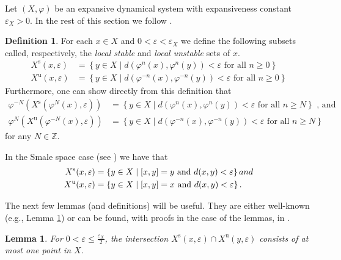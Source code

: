 \documentclass{amsart}
\newcommand{\Z}{{\mathbb Z}}
\theoremstyle{plain}
\newtheorem{lemma}[theorem]{Lemma}
\theoremstyle{definition}
\newtheorem{definition}[theorem]{Definition}
\theoremstyle{remark}
\begin{document}
Let $(X, \varphi)$ be an expansive dynamical system with expansiveness constant $\varepsilon_X > 0$.  In the rest of this section we follow \cite{fried1987}.
\begin{definition}\label{def:loc-stable-unstable-sets}
For each $x \in X$ and $0<\varepsilon < \varepsilon_X$ we define the following subsets called, respectively, the \emph{local stable} and \emph{local unstable} sets of $x$.
\begin{align*}
    X^\text{s}(x, \varepsilon) &= \left\{ y \in X \mid d\left(\varphi^n(x),\varphi^n(y)\right) < \varepsilon \text{ for all } n \geq 0 \right\} \\
    X^\text{u}(x, \varepsilon) &= \left\{ y \in X \mid d\left(\varphi^{-n}(x),\varphi^{-n}(y)\right) < \varepsilon \text{ for all } n \geq 0 \right\}
\end{align*}
Furthermore, one can show directly from this definition that
\begin{align*}
    \varphi^{-N}\left(X^\text{s}\left(\varphi^{N}(x), \varepsilon\right)\right) &= \left\{ y \in X \mid d\left(\varphi^n(x),\varphi^n(y)\right) < \varepsilon \text{ for all } n \geq N \right\} \text{ , and } \\
    \varphi^{N}\left(X^\text{u}\left(\varphi^{-N}(x), \varepsilon\right)\right) &= \left\{ y \in X \mid d\left(\varphi^{-n}(x),\varphi^{-n}(y)\right) < \varepsilon \text{ for all } n \geq N \right\}
\end{align*}
for any $N \in \Z$.
\end{definition}
In the Smale space case (see \cite[Definition 2.1.7]{MR3243636}) we have that 
\begin{align*}
    X^\text{s}(x, \varepsilon) &= \left\{ y \in X \mid [x, y]=y \hbox{ and }d(x,y)< \varepsilon \right\} and \\
    X^\text{u}(x, \varepsilon) &= \left\{ y \in X \mid [x,y]=x \hbox{ and }d(x,y)< \varepsilon \right\}.
\end{align*}

The next few lemmas (and definitions) will be useful. They are either well-known (e.g., Lemma \ref{lem:bracket-unique-intersection}) or can be found, with proofs in the case of the lemmas, in \cite{DeeSto}.

\begin{lemma}\label{lem:bracket-unique-intersection}
For $\displaystyle 0 < \varepsilon \leq \frac{\varepsilon_X}{2}$, the intersection $X^\text{s}(x, \varepsilon) \cap X^\text{u}(y, \varepsilon)$ consists of at most one point in $X$.
\end{lemma}
\end{document}
